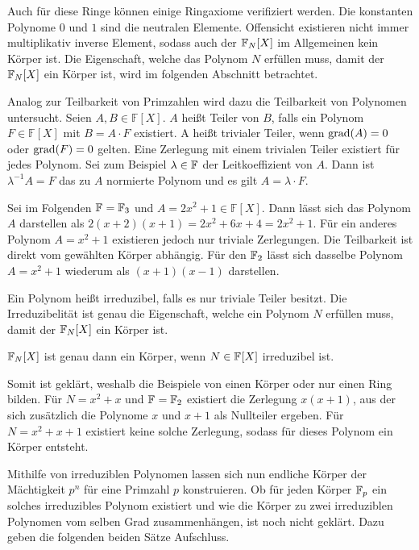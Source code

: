 Auch für diese Ringe können einige Ringaxiome verifiziert werden. Die konstanten Polynome $0$ und $1$ sind die neutralen Elemente. Offensicht existieren nicht immer multiplikativ inverse Element, sodass auch der $\field{N} {[X]}$ im Allgemeinen kein Körper ist. Die Eigenschaft, welche das Polynom $N$ erfüllen muss, damit der $\field{N} {[X]}$ ein Körper ist, wird im folgenden Abschnitt betrachtet.


Analog zur Teilbarkeit von Primzahlen wird dazu die Teilbarkeit von Polynomen untersucht. Seien $A,B \in \mathbb{F} {[X]}$. $A$ heißt Teiler von $B$, falls ein Polynom $F \in \mathbb{F} {[X]}$ mit $B = A \cdot F$ existiert. A heißt trivialer Teiler, wenn $\mathrm{grad}(A) = 0$ oder $\mathrm{grad}(F) = 0$ gelten. Eine Zerlegung mit einem trivialen Teiler existiert für jedes Polynom. Sei zum Beispiel $\lambda \in \field{}$  der Leitkoeffizient von $A$. Dann ist $\lambda^{-1}A = F$ das zu $A$ normierte Polynom und es gilt $A = \lambda\cdot F$.

Sei im Folgenden $\field{} = \field{3}$ und $A=2x^2 + 1 \in \mathbb{F} {[X]}$. Dann lässt sich das Polynom $A$ darstellen als $2(x+2)(x+1) = 2x^2 + 6x + 4 = 2x^2 + 1$. Für ein anderes Polynom $A=x^2 + 1$ existieren jedoch nur triviale Zerlegungen. Die Teilbarkeit ist direkt vom gewählten Körper abhängig. Für den $\field{2}$ lässt sich dasselbe Polynom $A=x^2 + 1$ wiederum als $(x+1)(x-1)$ darstellen.

Ein Polynom heißt irreduzibel, falls es nur triviale Teiler besitzt. Die Irreduzibelität ist genau die Eigenschaft, welche ein Polynom $N$ erfüllen muss, damit der $\field{N} {[X]}$ ein Körper ist. 

\begin{satz}
    $\field{N} {[X]}$ ist genau dann ein Körper, wenn $N \in \field{}{[X]}$ irreduzibel ist. 
\end{satz}

Somit ist geklärt, weshalb die Beispiele von  einen Körper oder nur einen Ring bilden. Für $N=x^2 + x$ und $\field{} = \field{2}$ existiert die Zerlegung $x(x+1)$, aus der sich zusätzlich die Polynome $x$ und $x+1$ als Nullteiler ergeben. Für $N=x^2 + x + 1$ existiert keine solche Zerlegung, sodass für dieses Polynom ein Körper entsteht.

Mithilfe von irreduziblen Polynomen lassen sich nun endliche Körper der Mächtigkeit $p^n$ für eine Primzahl $p$ konstruieren. Ob für jeden Körper $\field{p}$ ein solches irreduzibles Polynom existiert und wie die Körper zu zwei irreduziblen Polynomen vom selben Grad zusammenhängen, ist noch nicht geklärt. Dazu geben die folgenden beiden Sätze Aufschluss.

